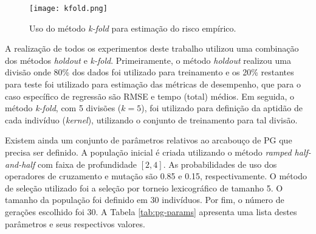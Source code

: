 \begin{figure}[H]
    \caption{Uso do método \textit{k-fold} para estimação do risco empírico.}
    \label{fig:k-fold}
    \centering
    \texttt{[image: kfold.png]}
    \begin{center}
    \end{center}
\end{figure}

A realização de todos os experimentos deste trabalho utilizou uma combinação dos métodos \textit{holdout} e \textit{k-fold}. Primeiramente, o método \textit{holdout} realizou uma divisão onde 80\% dos dados foi utilizado para treinamento e os 20\% restantes para teste foi utilizado para estimação das métricas de desempenho, que para o caso específico de regressão são RMSE e tempo (total) médios. Em seguida, o método \textit{k-fold}, com 5 divisões ($k=5$), foi utilizado para definição da aptidão de cada indivíduo (\textit{kernel}), utilizando o conjunto de treinamento para tal divisão.

Existem ainda um conjunto de parâmetros relativos ao arcabouço de PG que precisa ser definido. A população inicial é criada utilizando o método \textit{ramped half-and-half} com faixa de profundidade $[2, 4]$. As probabilidades de uso dos operadores de cruzamento e mutação são 0.85 e 0.15, respectivamente. O método de seleção utilizado foi a seleção por torneio lexicográfico de tamanho 5. O tamanho da população foi definido em 30 indivíduos. Por fim, o número de gerações escolhido foi 30. A Tabela \ref{tab:pg-params} apresenta uma lista destes parâmetros e seus respectivos valores.


